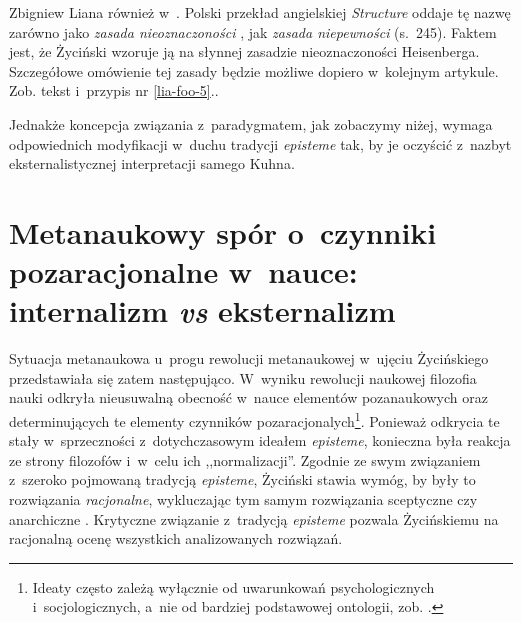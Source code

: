 \begin{artplenv}{Zbigniew Liana}
{również w~\parencite[s.~159]{zycinski_teizm_1985}.
Polski przekład angielskiej
\textit{Structure} oddaje tę nazwę zarówno jako \textit{zasada nieoznaczoności}
\parencite[s.~240]{zycinski_struktura_2013},
jak \textit{zasada niepewności}
(s.~245).
Faktem jest, że
Życiński wzoruje ją na słynnej zasadzie nieoznaczoności Hei\-senberga. Szczegółowe omówienie tej zasady będzie możliwe
dopiero w~kolejnym artykule. Zob. tekst i~przypis nr \ref{lia-foo-5}.}.

Jednakże koncepcja związania z~paradygmatem, jak zobaczymy niżej, wymaga odpowiednich modyfikacji w~duchu tradycji
\textit{episteme} tak, by je oczyścić z~nazbyt eksternalistycznej interpretacji samego Kuhna.

\section{Metanaukowy spór o~czynniki pozaracjonalne w~nauce: internalizm \textit{vs} eksternalizm}\label{lia-sec-5}

Sytuacja metanaukowa u~progu rewolucji metanaukowej w~ujęciu Życińskiego przedstawiała się zatem następująco. W~wyniku
rewolucji naukowej filozofia nauki odkryła nieusuwalną obecność w~nauce elementów pozanaukowych oraz determinujących te
elementy czynników pozaracjonalych\footnote{Ideaty często zależą wyłącznie od uwarunkowań
psychologicznych i~socjologicznych, a~nie od bardziej podstawowej ontologii, zob.
\parencites[s.~29]{zycinski_structure_1988}[s.~51]{zycinski_struktura_2013}.
}. Ponieważ odkrycia te stały w~sprzeczności z~dotychczasowym ideałem \textit{episteme}, konieczna była
reakcja ze strony filozofów i~w~celu ich ,,normalizacji''. Zgodnie ze swym związaniem z~szeroko pojmowaną tradycją
\textit{episteme}, Życiński stawia wymóg, by były to rozwiązania \textit{racjonalne}, wykluczając tym samym rozwiązania
sceptyczne czy anarchiczne
\parencites[s.~143]{zycinski_structure_1988}[s.~254]{zycinski_struktura_2013}.
Krytyczne
związanie z~tradycją \textit{episteme} pozwala Życińskiemu na racjonalną ocenę wszystkich analizowanych rozwiązań.


\end{artplenv}
